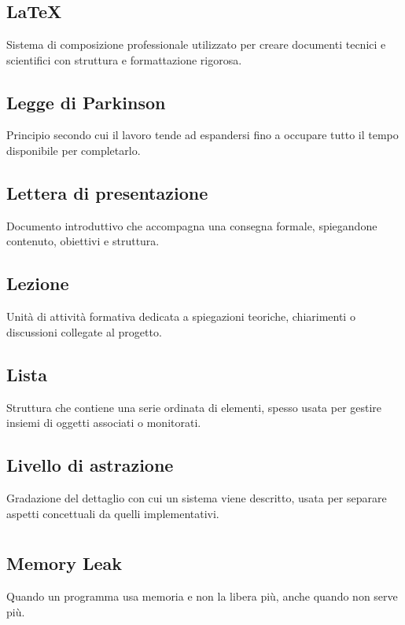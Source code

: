 \documentclass[a4paper,12pt]{article}
\begin{document}
\newpage 
        \section{}
        
          \subsection*{LaTeX}
			Sistema di composizione professionale utilizzato per creare documenti tecnici e scientifici con struttura e formattazione rigorosa.
          \subsection*{Legge di Parkinson}
			Principio secondo cui il lavoro tende ad espandersi fino a occupare tutto il tempo disponibile per completarlo.
          \subsection*{Lettera di presentazione}
			Documento introduttivo che accompagna una consegna formale, spiegandone contenuto, obiettivi e struttura.
          \subsection*{Lezione}
			Unità di attività formativa dedicata a spiegazioni teoriche, chiarimenti o discussioni collegate al progetto.
          \subsection*{Lista}
			Struttura che contiene una serie ordinata di elementi, spesso usata per gestire insiemi di oggetti associati o monitorati.
          \subsection*{Livello di astrazione}
			Gradazione del dettaglio con cui un sistema viene descritto, usata per separare aspetti concettuali da quelli implementativi.
        
\newpage
        \section{}
        
          \subsection*{Memory Leak}
			Quando un programma usa memoria e non la libera più, anche quando non serve più.
\end{document}
